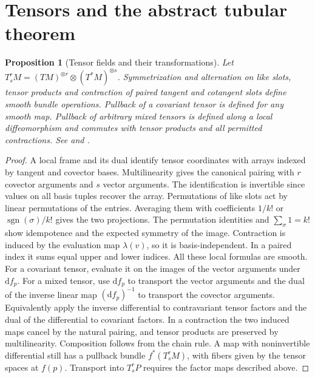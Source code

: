 \documentclass[11pt,oneside,openany]{book}
\newtheorem{proposition}[theorem]{Proposition}
\theoremstyle{definition}
\theoremstyle{remark}
\newcommand{\dd}{\mathrm d}
\begin{document}
\section{Tensors and the abstract tubular theorem}

\begin{proposition}[Tensor fields and their transformations]\label{p104:M05.07}
Let \(T^r_sM=(TM)^{\otimes r}\otimes(T^*M)^{\otimes s}\). Symmetrization and alternation on like slots, tensor products and contraction of paired tangent and cotangent slots define smooth bundle operations. Pullback of a covariant tensor is defined for any smooth map. Pullback of arbitrary mixed tensors is defined along a local diffeomorphism and commutes with tensor products and all permitted contractions. See \cite[Chapter 12]{lee} and \cite[\S3]{tu}.
\end{proposition}
\begin{proof}
A local frame and its dual identify tensor coordinates with arrays indexed by tangent and covector bases. Multilinearity gives the canonical pairing with \(r\) covector arguments and \(s\) vector arguments. The identification is invertible since values on all basis tuples recover the array. Permutations of like slots act by linear permutations of the entries. Averaging them with coefficients \(1/k!\) or \(\operatorname{sgn}(\sigma)/k!\) gives the two projections. The permutation identities and \(\sum_\sigma 1=k!\) show idempotence and the expected symmetry of the image. Contraction is induced by the evaluation map \(\lambda(v)\), so it is basis-independent. In a paired index it sums equal upper and lower indices. All these local formulas are smooth. For a covariant tensor, evaluate it on the images of the vector arguments under \(\dd f_p\). For a mixed tensor, use \(\dd f_p\) to transport the vector arguments and the dual of the inverse linear map \((\dd f_p)^{-1}\) to transport the covector arguments. Equivalently apply the inverse differential to contravariant tensor factors and the dual of the differential to covariant factors. In a contraction the two induced maps cancel by the natural pairing, and tensor products are preserved by multilinearity. Composition follows from the chain rule. A map with noninvertible differential still has a pullback bundle \(f^*(T^r_sM)\), with fibers given by the tensor spaces at \(f(p)\). Transport into \(T^r_sP\) requires the factor maps described above.
\end{proof}
\end{document}
